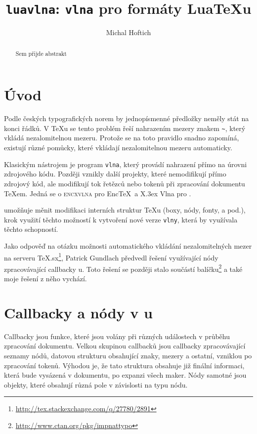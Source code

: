 \documentclass{csbulletin}
\begin{document}
\title{\texttt{luavlna}: \texttt{vlna} pro formáty Lua\TeX u}
\author{Michal Hoftich}
\begin{abstract}
Sem přijde abstrakt
\end{abstract}

\section{Úvod}
Podle českých typografických norem by jednopísmenné předložky neměly stát na 
konci řádků. V \TeX u se tento problém řeší nahrazením mezery znakem \verb|~|,
který vkládá nezalomitelnou mezeru. Protože se na toto pravidlo snadno zapomíná,
existují různé pomůcky, které vkládají nezalomitelnou mezeru automaticky.

Klasickým nástrojem je program \verb|vlna|, který provádí nahrazení přímo na
úrovni zdrojového kódu. Později vznikly další projekty, které nemodifikují přímo
zdrojový kód, ale modifikují tok řetězců nebo tokenů při zpracování dokumentu 
\TeX em. Jedná se o \textsc{encxvlna} pro Enc\TeX\ a X\raisebox{\myminus.5ex}{Ǝ}\kern\myminus.3ex Vlna pro .

 umožňuje měnit 
modifikaci interních struktur \TeX u 
(boxy, nódy, fonty, a pod.),  krok využití těchto možností
k vytvoření nové verze \verb|vlny|, která by využívala těchto schopností. 

Jako odpověď na otázku možnosti automatického vkládání nezalomitelných mezer 
na serveru TeX.sx\footnote{\url{http://tex.stackexchange.com/q/27780/2891}}, 
Patrick Gundlach předvedl řešení využívající nódy zpracovávající callbacky 
u. Toto řešení se později stalo součástí balíčku\footnote{%
\url{http://www.ctan.org/pkg/impnattypo}} a také moje řešení z něho vychází.

\section{Callbacky a nódy v u}




Callbacky jsou funkce, které jsou volány při různých událostech v průběhu
zpracování dokumentu. Velkou skupinou callbacků jsou callbacky zpracovávající 
seznamy nódů, datovou strukturu obsahující znaky, mezery a ostatní, vzniklou po
zpracování tokenů. Výhodou je, že tato struktura obsahuje již finální informaci,
která bude vysázená v dokumentu, po expanzi všech maker. Nódy samotné jsou 
objekty, které obsahují různá pole v závislosti na typu nódu.
\end{document}
